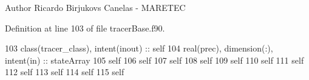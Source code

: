 \begin{DoxyAuthor}{Author}
Ricardo Birjukovs Canelas -\/ M\+A\+R\+E\+T\+EC 
\end{DoxyAuthor}


Definition at line 103 of file tracer\+Base.\+f90.


\begin{DoxyCode}
103     \textcolor{keywordtype}{class}(tracer\_class), \textcolor{keywordtype}{intent(inout)} :: self
104     \textcolor{keywordtype}{real(prec)}, \textcolor{keywordtype}{dimension(:)}, \textcolor{keywordtype}{intent(in)} :: stateArray
105     self%
106     self%
107     self%
108     self%
109     self%
110     self%
111     self%
112     self%
113     self%
114     self%
115     self%
\end{DoxyCode}
